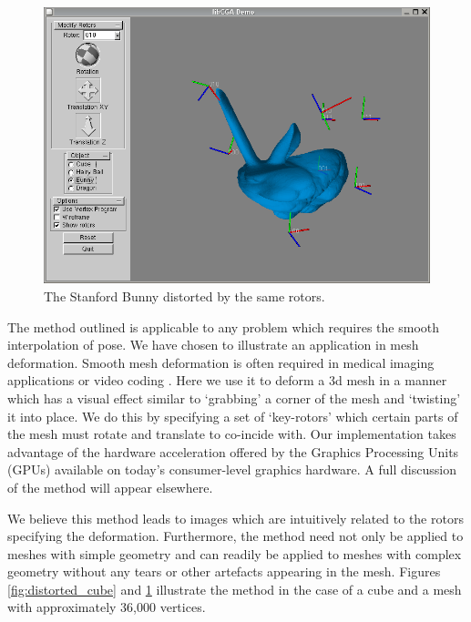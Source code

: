 \begin{figure}[p]
\centering
\includegraphics[width=0.7\columnwidth]{distorted_bunny}
\caption{\label{fig:distorted_bunny}%
  The Stanford Bunny\cite{bunny} distorted by the same rotors.
}
\end{figure}

The method outlined is applicable to any problem which requires the smooth
interpolation of pose. We have chosen to illustrate an application in
mesh deformation. Smooth mesh deformation is often required in medical 
imaging applications \cite{ACM:614422} or video coding \cite{ACM:704422}.
Here we use it to deform a 3d mesh in a manner which has a visual effect
similar to `grabbing' a corner of the mesh and `twisting' it into place.
We do this by specifying a set of `key-rotors' which certain parts of the
mesh must rotate and translate to co-incide with. Our implementation takes
advantage of the hardware acceleration offered by the Graphics
Processing Units (GPUs) available on today's consumer-level graphics 
hardware. A full discussion of the method will appear elsewhere.

We believe this method leads to images which are intuitively related to
the rotors specifying the deformation. Furthermore, the method need not
only be applied to meshes with simple geometry and can readily be applied to
meshes with complex geometry without any tears or other artefacts appearing
in the mesh. Figures \ref{fig:distorted_cube} and \ref{fig:distorted_bunny}
illustrate the method in the case of a cube and a mesh with approximately
36,000 vertices.


